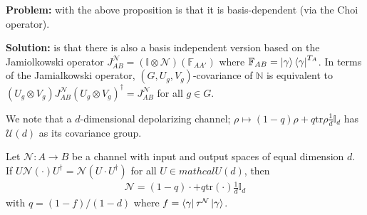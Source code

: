 \documentclass[../../note.tex]{subfiles}
\begin{document}
\noindent \textbf{Problem:} with the above proposition is that it is basis-dependent (via the Choi operator). 

\noindent\textbf{Solution:} is that there is also a basis independent version based on the Jamiolkowski operator $J^{\mathcal{N}}_{AB} = (\mathbb{I}\otimes \mathcal{N})(\mathbb{F}_{AA'})$ where $\mathbb{F}_{AB} =\ket{\gamma}\bra{\gamma}^{T_A}$. In terms of the Jamialkowski operator, $(G,U_g,V_g)$-covariance of $\mathbb{N}$ is equivalent to $(U_g \otimes V_g) J^{\mathcal{N}}_{AB} (U_g \otimes V_g)^{\dagger} = J_{AB}^{\mathcal{N}}$ for all $g \in G$.

We note that a $d$-dimensional depolarizing channel; $\rho \mapsto (1-q)\rho + q \text{tr}\rho \frac{1}{d} \mathbb{I}_d$ has $\mathcal{U}(d)$ as its covariance group. 

\begin{proposition}
Let $\mathcal{N}: A\rightarrow B$ be a channel with input and output spaces of equal dimension $d$. If $U \mathcal{N}(\cdot) U^{\dagger}=\mathcal{N}(U \cdot U^{\dagger})$ for all $U\in mathcal{U}(d)$, then 
\begin{align}
    \mathcal{N}=(1-q) \cdot + q \text{tr}(\cdot) \frac{1}{d} \mathbb{I}_d
\end{align}
with $q=(1-f)/(1-d)$ where $f=\bra{\gamma}\tau^{\mathcal{N}}\ket{\gamma}$.
\end{proposition}
{}

\end{document}
